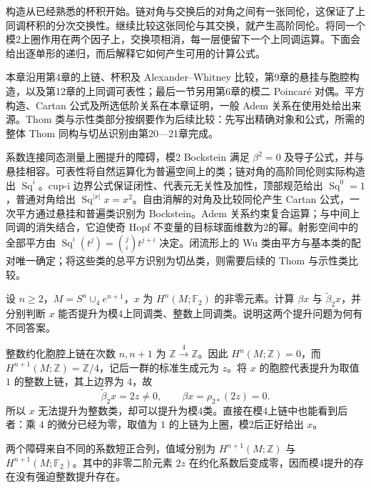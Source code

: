 \ProseParagraphBreak

构造从已经熟悉的杯积开始。链对角与交换后的对角之间有一张同伦，这保证了上同调杯积的分次交换性。继续比较这张同伦与其交换，就产生高阶同伦。将同一个模2上圈作用在两个因子上，交换项相消，每一层便留下一个上同调运算。下面会给出逐单形的递归，而后解释它如何产生可用的计算公式。

\ProseParagraphBreak

本章沿用第4章的上链、杯积及 Alexander--Whitney 比较，第9章的悬挂与胞腔构造，以及第12章的上同调可表性；最后一节另用第6章的模二 Poincaré 对偶。平方构造、Cartan 公式及所选低阶关系在本章证明，一般 Adem 关系在使用处给出来源。Thom 类与示性类部分按纲要作为后续比较：先写出精确对象和公式，所需的整体 Thom 同构与切丛识别由第20—21章完成。






\begin{chaptersummary}
	系数连接同态测量上圈提升的障碍，模2 Bockstein 满足 \(\beta^2=0\) 及导子公式，并与悬挂相容。可表性将自然运算化为普遍空间上的类；链对角的高阶同伦则实际构造出 \(\operatorname{Sq}^i\)。cup-i 边界公式保证闭性、代表元无关性及加性，顶部规范给出 \(\operatorname{Sq}^0=1\)，普通对角给出 \(\operatorname{Sq}^{|x|}x=x^2\)。自由消解的对角及比较同伦产生 Cartan 公式，一次平方通过悬挂和普遍类识别为 Bockstein。Adem 关系约束复合运算；与中间上同调的消失结合，它迫使奇 Hopf 不变量的目标球面维数为2的幂。射影空间中的全部平方由 \(\operatorname{Sq}^i(t^j)=\binom ji t^{j+i}\) 决定。闭流形上的 Wu 类由平方与基本类的配对唯一确定；将这些类的总平方识别为切丛类，则需要后续的 Thom 与示性类比较。
\end{chaptersummary}

\BookExercises

\begin{exercise}\label{g2:ex:mod-four-versus-integral-lift}
	设 \(n\ge2\)，\(M=S^n\cup_4e^{n+1}\)，\(x\) 为 \(H^n(M;\mathbb F_2)\) 的非零元素。计算 \(\beta x\) 与 \(\widetilde\beta_2x\)，并分别判断 \(x\) 能否提升为模4上同调类、整数上同调类。说明这两个提升问题为何有不同答案。
\end{exercise}
\begin{solution}
	整数约化胞腔上链在次数 \(n,n+1\) 为 \(\mathbb Z\xrightarrow{4}\mathbb Z\)。因此 \(H^n(M;\mathbb Z)=0\)，而 \(H^{n+1}(M;\mathbb Z)=\mathbb Z/4\)，记后一群的标准生成元为 \(z\)。将 \(x\) 的胞腔代表提升为取值 \(1\) 的整数上链，其上边界为 \(4\)，故
	\[
		\widetilde\beta_2x=2z\ne0,\qquad\beta x=\rho_{2*}(2z)=0.
	\]
	所以 \(x\) 无法提升为整数类，却可以提升为模4类。直接在模4上链中也能看到后者：乘 \(4\) 的微分已经为零，取值为 \(1\) 的上链为上圈，模2后正好给出 \(x\)。

	两个障碍来自不同的系数短正合列，值域分别为 \(H^{n+1}(M;\mathbb Z)\) 与 \(H^{n+1}(M;\mathbb F_2)\)。其中的非零二阶元素 \(2z\) 在约化系数后变成零，因而模4提升的存在没有强迫整数提升存在。
\end{solution}

